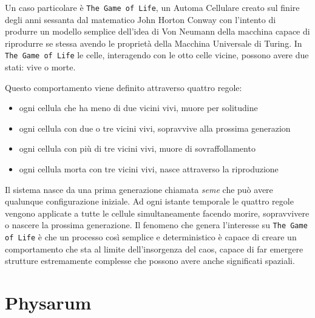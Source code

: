\par
Un caso particolare è \texttt{The Game of Life}, un Automa Cellulare creato sul finire degli anni sessanta dal matematico John Horton Conway con l’intento di produrre un modello semplice dell’idea di Von Neumann della macchina capace di riprodurre se stessa avendo le proprietà della Macchina Universale di Turing. In \texttt{The Game of Life} le celle, interagendo con le otto celle vicine, possono avere due stati: vive o morte.
\par
Questo comportamento viene definito attraverso quattro regole:
\begin{itemize}
\item ogni cellula che ha meno di due vicini vivi, muore per solitudine
\item ogni cellula con due o tre vicini vivi, sopravvive alla prossima generazion
\item ogni cellula con più di tre vicini vivi, muore di sovraffollamento
\item ogni cellula morta con tre vicini vivi, nasce attraverso la riproduzione
\end{itemize}
\par
Il sistema nasce da una prima generazione chiamata \textit{seme} che può avere qualunque configurazione iniziale. Ad ogni istante temporale le quattro regole vengono applicate a tutte le cellule simultaneamente facendo morire, sopravvivere o nascere la prossima generazione. Il fenomeno che genera l’interesse su \texttt{The Game of Life} è che un processo così semplice e deterministico è capace di creare un comportamento che sta al limite dell’insorgenza del caos, capace di far emergere strutture estremamente complesse che possono avere anche significati spaziali.


\section{Physarum}

